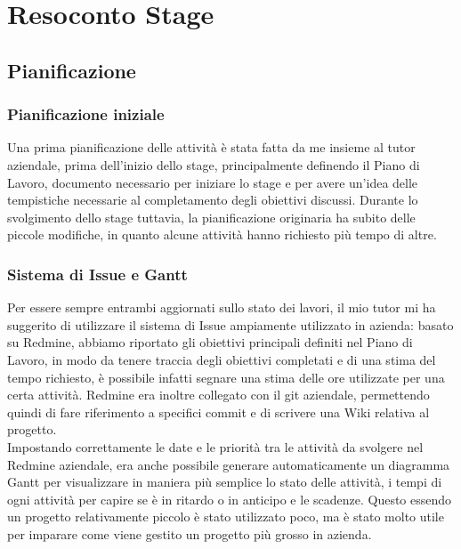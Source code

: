 
\chapter{Resoconto Stage}
\label{cap:resoconto-stage}

\section{Pianificazione}
\subsection{Pianificazione iniziale}\label{sec:pianificazione-iniziale}
Una prima pianificazione delle attività è stata fatta da me insieme al tutor aziendale, prima dell'inizio dello stage, principalmente definendo il Piano di Lavoro, documento necessario per iniziare lo stage e per avere un'idea delle tempistiche necessarie al completamento degli obiettivi discussi. Durante lo svolgimento dello stage tuttavia, la pianificazione originaria ha subito delle piccole modifiche, in quanto alcune attività hanno richiesto più tempo di altre. 

\subsection{Sistema di Issue e Gantt}
Per essere sempre entrambi aggiornati sullo stato dei lavori, il mio tutor mi ha suggerito di utilizzare il sistema di Issue ampiamente utilizzato in azienda: basato su Redmine, abbiamo riportato gli obiettivi principali definiti nel Piano di Lavoro, in modo da tenere traccia degli obiettivi completati e di una stima del tempo richiesto, è possibile infatti segnare una stima delle ore utilizzate per una certa attività. Redmine era inoltre collegato con il git aziendale, permettendo quindi di fare riferimento a specifici commit e di scrivere una Wiki relativa al progetto.
\\
Impostando correttamente le date e le priorità tra le attività da svolgere nel Redmine aziendale, era anche possibile generare automaticamente un diagramma Gantt per visualizzare in maniera più semplice lo stato delle attività, i tempi di ogni attività per capire se è in ritardo o in anticipo e le scadenze. Questo essendo un progetto relativamente piccolo è stato utilizzato poco, ma è stato molto utile per imparare come viene gestito un progetto più grosso in azienda.



